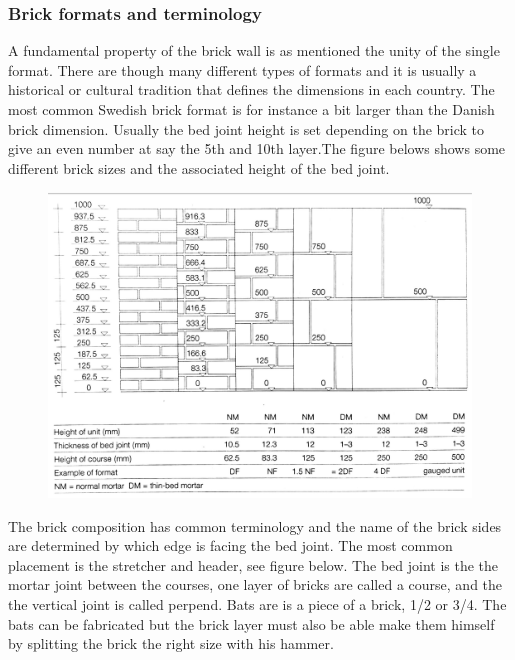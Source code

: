 \subsubsection{Brick formats and terminology}

A fundamental property of the brick wall is as mentioned the unity of the single format. There are though many different types of formats and it is usually a historical or cultural tradition that defines the dimensions in each country. The most common Swedish brick format is for instance a bit larger than the Danish brick dimension. Usually the bed joint height is set depending on the brick to give an even number at say the 5th and 10th layer.The figure belows shows some different brick sizes and the associated height of the bed joint.

\begin{figure}[H]
\centering
\includegraphics[width=0.9\linewidth ]{figure/Introduction/brickmeasures.pdf}
\caption{\cite{ref:Pfeifer}}
\end{figure}

The brick composition has common terminology and the name of the brick sides are determined by which edge is facing the bed joint. The most common placement is the stretcher and header, see figure below. The bed joint is the the mortar joint between the courses, one layer of bricks are called a course, and the the vertical joint is called perpend. Bats are is a piece of a brick, 1/2 or 3/4. The bats can be fabricated but the brick layer must also be able make them himself by splitting the brick the right size with his hammer.\cite{ref:Mitchell}

